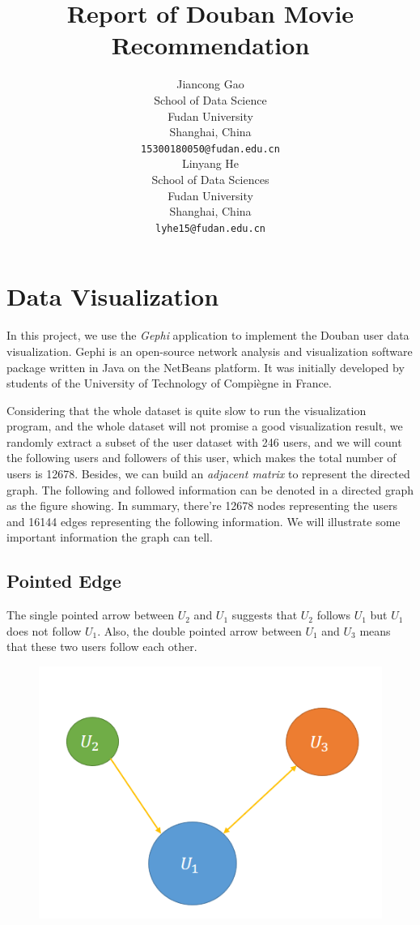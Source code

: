 \documentclass[11pt,a4paper]{article}
\title{Report of Douban Movie Recommendation}
\author{Jiancong Gao \\
  School of Data Science \\
  Fudan University \\
  Shanghai, China \\
  {\tt 15300180050@fudan.edu.cn} \\\And
  Linyang He \\
  School of Data Sciences \\
  Fudan University \\
  Shanghai, China \\
  {\tt lyhe15@fudan.edu.cn} \\}
\date{}
\begin{document}
\maketitle
\section{Data Visualization}

In this project, we use the \emph{Gephi} application to implement the
Douban user data visualization. Gephi is an open-source network analysis
and visualization software package written in Java on the NetBeans
platform. It was initially developed by students of the University of
Technology of Compiègne in France.

Considering that the whole dataset is quite slow to run the
visualization program, and the whole dataset will not promise a good
visualization result, we randomly extract a subset of the user dataset
with 246 users, and we will count the following users and followers of
this user, which makes the total number of users is 12678. Besides, we
can build an \emph{adjacent matrix} to represent the directed graph. The
following and followed information can be denoted in a directed graph as
the figure showing. In summary, there're 12678 nodes representing the
users and 16144 edges representing the following information. We will
illustrate some important information the graph can tell.

\subsection{Pointed Edge}

The single pointed arrow between \(U_2\) and \(U_1\) suggests that
\(U_2\) follows \(U_1\) but \(U_1\) does not follow \(U_1\). Also, the
double pointed arrow between \(U_1\) and \(U_3\) means that these two
users follow each other.

\begin{figure}
\centering
\includegraphics[width = \columnwidth]{1.png}
\caption{}
\end{figure}
\end{document}
